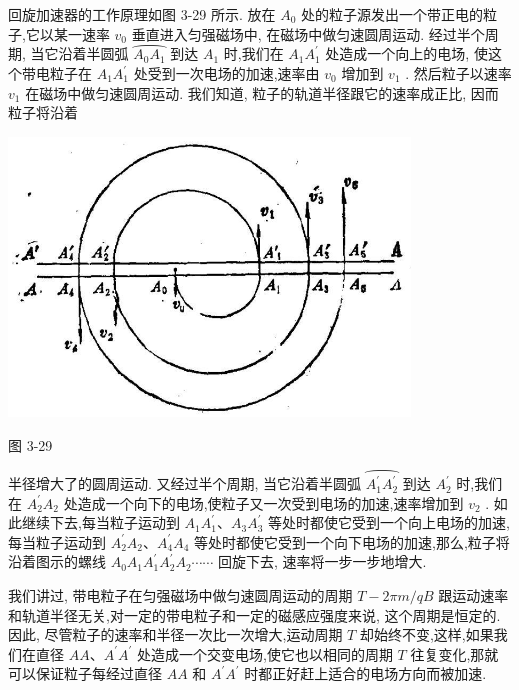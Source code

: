 \documentclass[10pt]{article}
\begin{document}
回旋加速器的工作原理如图 3-29 所示. 放在 \({A}_{0}\) 处的粒子源发出一个带正电的粒子,它以某一速率 \({v}_{0}\) 垂直进入匀强磁场中, 在磁场中做匀速圆周运动. 经过半个周期, 当它沿着半圆弧 \(\overset{⏜}{{A}_{0}{A}_{1}}\) 到达 \({A}_{1}\) 时,我们在 \({A}_{1}{A}_{1}^{\prime }\) 处造成一个向上的电场, 使这个带电粒子在 \({A}_{1}{A}_{1}^{\prime }\) 处受到一次电场的加速,速率由 \({v}_{0}\) 增加到 \({v}_{1}\) . 然后粒子以速率 \({v}_{1}\) 在磁场中做匀速圆周运动. 我们知道, 粒子的轨道半径跟它的速率成正比, 因而粒子将沿着

\begin{center}
\includegraphics[max width=0.8\textwidth]{images/01913056-1f15-74d8-9184-9aab52c9d66b_125_508984.jpg}
\end{center}

图 3-29

半径增大了的圆周运动. 又经过半个周期, 当它沿着半圆弧 \(\overset{⏜}{{A}_{1}^{\prime }{A}_{2}^{\prime }}\) 到达 \({A}_{2}^{\prime }\) 时,我们在 \({A}_{2}^{\prime }{A}_{2}\) 处造成一个向下的电场,使粒子又一次受到电场的加速,速率增加到 \({v}_{2}\) . 如此继续下去,每当粒子运动到 \({A}_{1}{A}_{1}^{\prime }\text{、}{A}_{3}{A}_{3}^{\prime }\) 等处时都使它受到一个向上电场的加速,每当粒子运动到 \({A}_{2}^{\prime }{A}_{2}\text{、}{A}_{4}^{\prime }{A}_{4}\) 等处时都使它受到一个向下电场的加速,那么,粒子将沿着图示的螺线 \({A}_{0}{A}_{1}{A}_{1}^{\prime }{A}_{2}^{\prime }{A}_{2}\cdots \cdots\) 回旋下去, 速率将一步一步地增大.

我们讲过, 带电粒子在匀强磁场中做匀速圆周运动的周期 \(T - {2\pi m}/{qB}\) 跟运动速率和轨道半径无关,对一定的带电粒子和一定的磁感应强度来说, 这个周期是恒定的. 因此, 尽管粒子的速率和半径一次比一次增大,运动周期 \(T\) 却始终不变,这样,如果我们在直径 \({AA}\text{、}{A}^{\prime }{A}^{\prime }\) 处造成一个交变电场,使它也以相同的周期 \(T\) 往复变化,那就可以保证粒子每经过直径 \({AA}\) 和 \({A}^{\prime }{A}^{\prime }\) 时都正好赶上适合的电场方向而被加速.
\end{document}
